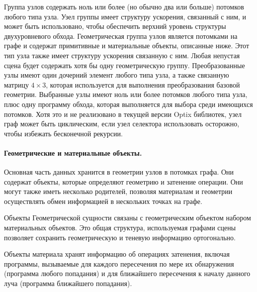Группа узлов содержать ноль или более (но обычно два или больше) потомков любого типа узла.
Узел группы имеет структуру ускорения, связанный с ним, и может быть использовано, чтобы обеспечить верхний уровень структуры двухуровневого обхода.
Геометрическая группа узлов является потомками на графе и содержат примитивные и материальные объекты, описанные ниже.
Этот тип узла также имеет структуру ускорения связанную с ним.
Любая непустая сцена будет содержать хотя бы одну геометрическую группу.
Преобразованные узлы имеют один дочерний элемент любого типа узла, а также связанную матрицу $4 \times 3$, которая используется для выполнения преобразования базовой геометрии.
Выбранные узлы имеют ноль или более потомков любого типа узла, плюс одну программу обхода, которая выполняется для выбора среди имеющихся потомков.
Хотя это и не реализовано в текущей версии Optix библиотек, узел граф может быть циклическим, если узел селектора использовать осторожно, чтобы избежать бесконечной рекурсии.

\paragraph{ Геометрические и материальные объекты.}

Основная часть данных хранится в геометрии узлов в потомках графа.
Они содержат объекты, которые определяют геометрию и затенение операции.
Они могут также иметь несколько родителей, позволяя материалам и геометрии осуществлять обмен информацией в нескольких точках на графе.

Объекты Геометрической сущности связаны с геометрическим объектом набором материальных объектов.
Это общая структура, используемая графами сцены позволяет сохранить геометрическую и теневую информацию ортогонально.

Объекты материала хранят информацию об операциях затенения, включая программы, вызываемые для каждого пересечения по мере их обнаружения (программа любого попадания) и для ближайшего пересечения к началу данного луча (программа ближайшего попадания).

